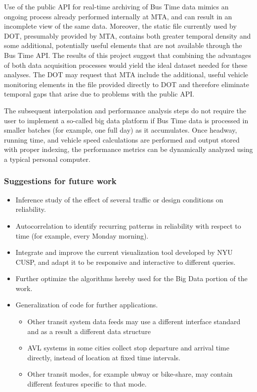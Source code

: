 \documentclass[12pt]{report}
\begin{document}
Use of the public API for real-time archiving of Bus Time data mimics an ongoing process already performed internally at MTA, and can result in an incomplete view of the same data.  Moreover, the static file currently used by DOT, presumably provided by MTA, contains both greater temporal density and some additional, potentially useful elements that are not available through the Bus Time API.  The results of this project suggest that combining the advantages of both data acquisition processes would yield the ideal dataset needed for these analyses.  The DOT may request that MTA include the additional, useful vehicle monitoring elements in the file provided directly to DOT and therefore eliminate temporal gaps that arise due to problems with the public API.


The subsequent interpolation and performance analysis steps do not require the user to implement a so-called big data platform if Bus Time data is processed in smaller batches (for example, one full day) as it accumulates.  Once headway, running time, and vehicle speed calculations are performed and output stored with proper indexing, the performance metrics can be dynamically analyzed using a typical personal computer.


\subsubsection*{Suggestions for future work}

\begin{itemize}
\item Inference study of the effect of several traffic or design conditions on reliability.
\item  Autocorrelation to identify recurring patterns in reliability with respect to time (for example, every Monday morning).
\item Integrate and improve the current visualization tool developed by NYU CUSP, and adapt it to be responsive and interactive to different queries.
\item Further optimize the algorithms hereby used for the Big Data portion of the work.
\item Generalization of code for further applications.
\begin{itemize}
\item Other transit system data feeds may use a different interface standard and as a result a different data structure
\item AVL systems in some cities collect stop departure and arrival time directly, instead of location at fixed time intervals.
\item Other transit modes, for example ubway or bike-share,  may contain different features specific to that mode.
\end{itemize}
\end{itemize}
\end{document}
